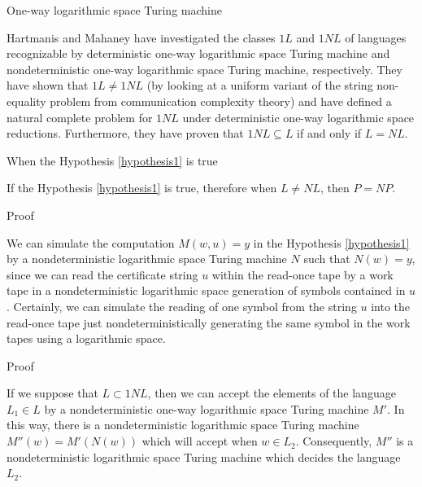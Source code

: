\documentclass[11pt]{beamer}
\begin{document}
\begin{frame}{One-way logarithmic space Turing machine}

Hartmanis and Mahaney have investigated the classes $1L$ and $1NL$ of languages recognizable by deterministic one-way logarithmic space Turing machine and nondeterministic one-way logarithmic space Turing machine, respectively. They have shown that $1L \neq 1NL$ (by looking at a uniform variant of the string non-equality problem from communication complexity theory) and have defined a natural complete problem for $1NL$ under deterministic one-way logarithmic space reductions. Furthermore, they have proven that $1NL \subseteq L$ if and only if $L=NL$.

\end{frame}

\begin{frame}{When the Hypothesis \ref{hypothesis1} is true}

\begin{theorem}
\label{neg-implication}
If the Hypothesis \ref{hypothesis1} is true, therefore when $L \neq NL$, then $P = NP$.
\end{theorem}

\end{frame}

\begin{frame}{Proof}

We can simulate the computation $M(w, u) = y$ in the Hypothesis \ref{hypothesis1} by a nondeterministic logarithmic space Turing machine $N$ such that $N(w) = y$, since we can read the certificate string $u$ within the read-once tape by a work tape in a nondeterministic logarithmic space generation of symbols contained in $u$. Certainly, we can simulate the reading of one symbol from the string $u$ into the read-once tape just nondeterministically generating the same symbol in the work tapes using a logarithmic space.

\end{frame}

\begin{frame}{Proof}

If we suppose that $L \subset 1NL$, then we can accept the elements of the language $L_{1} \in L$ by a nondeterministic one-way logarithmic space Turing machine $M'$. In this way, there is a nondeterministic logarithmic space Turing machine $M''(w) = M'(N(w))$ which will accept when $w \in L_{2}$. Consequently, $M''$ is a nondeterministic logarithmic space Turing machine which decides the language $L_{2}$.

\end{frame}
\end{document}
